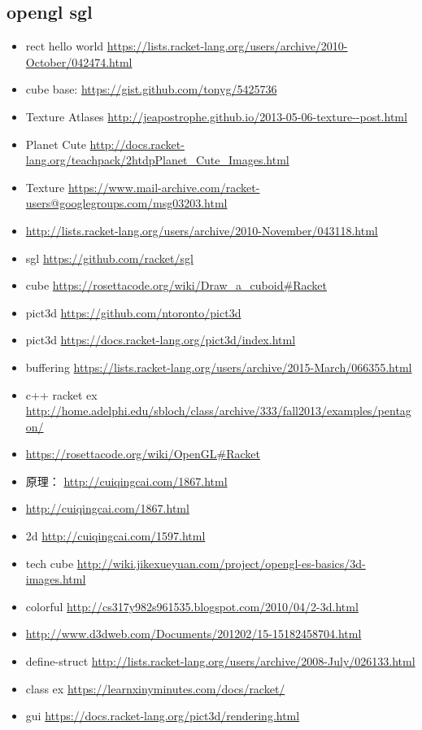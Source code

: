 \documentclass[9pt,b5paper]{article}
\begin{document}
\subsection{opengl sgl}
\label{sec-2-2}
\begin{itemize}
\item rect hello world \url{https://lists.racket-lang.org/users/archive/2010-October/042474.html}
\item cube base: \url{https://gist.github.com/tonyg/5425736}
\item Texture Atlases \url{http://jeapostrophe.github.io/2013-05-06-texture--post.html}
\item Planet Cute \url{http://docs.racket-lang.org/teachpack/2htdpPlanet_Cute_Images.html}
\item Texture \url{https://www.mail-archive.com/racket-users@googlegroups.com/msg03203.html}
\item \url{http://lists.racket-lang.org/users/archive/2010-November/043118.html}
\item sgl \url{https://github.com/racket/sgl}
\item cube \url{https://rosettacode.org/wiki/Draw_a_cuboid#Racket}
\item pict3d \url{https://github.com/ntoronto/pict3d}
\item pict3d \url{https://docs.racket-lang.org/pict3d/index.html}
\item buffering \url{https://lists.racket-lang.org/users/archive/2015-March/066355.html}
\item c++ racket ex \url{http://home.adelphi.edu/sbloch/class/archive/333/fall2013/examples/pentagon/}
\item \url{https://rosettacode.org/wiki/OpenGL#Racket}
\item 原理： \url{http://cuiqingcai.com/1867.html}
\item \url{http://cuiqingcai.com/1867.html}
\item 2d \url{http://cuiqingcai.com/1597.html}
\item tech cube \url{http://wiki.jikexueyuan.com/project/opengl-es-basics/3d-images.html}
\item colorful \url{http://cs317y982s961535.blogspot.com/2010/04/2-3d.html}
\item \url{http://www.d3dweb.com/Documents/201202/15-15182458704.html}
\item define-struct \url{http://lists.racket-lang.org/users/archive/2008-July/026133.html}
\item class ex \url{https://learnxinyminutes.com/docs/racket/}
\item gui \url{https://docs.racket-lang.org/pict3d/rendering.html}
\end{itemize}
\end{document}
